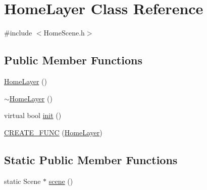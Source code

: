 \hypertarget{class_home_layer}{\section{\-Home\-Layer \-Class \-Reference}
\label{class_home_layer}
}


{\ttfamily \#include $<$\-Home\-Scene.\-h$>$}

\subsection*{\-Public \-Member \-Functions}
\begin{DoxyCompactItemize}
\item 
\hyperlink{class_home_layer_a70820b0aae19e4cf50d11413db578af6}{\-Home\-Layer} ()
\item 
\hyperlink{class_home_layer_a74c4bad7f4d90f02536645886b86529b}{$\sim$\-Home\-Layer} ()
\item 
virtual bool \hyperlink{class_home_layer_a7b39d554c7e3089a0855b471496ea0b6}{init} ()
\item 
\hyperlink{class_home_layer_ad72b3afd71127c67721d1d04aea5ffe9}{\-C\-R\-E\-A\-T\-E\-\_\-\-F\-U\-N\-C} (\hyperlink{class_home_layer}{\-Home\-Layer})
\end{DoxyCompactItemize}
\subsection*{\-Static \-Public \-Member \-Functions}
\begin{DoxyCompactItemize}
\item 
static \-Scene $\ast$ \hyperlink{class_home_layer_abfa48630fcd7c04d077c92c673d419af}{scene} ()
\end{DoxyCompactItemize}


